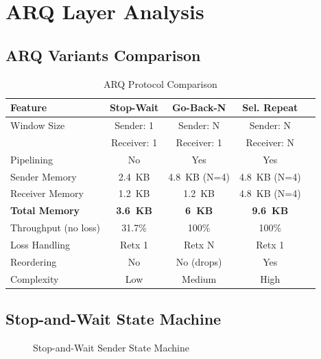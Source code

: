 \documentclass[12pt,letterpaper]{article}
\begin{document}
\section{ARQ Layer Analysis}

\subsection{ARQ Variants Comparison}

\begin{table}[H]
\centering
\caption{ARQ Protocol Comparison}
\begin{tabular}{lcccc}
\toprule
\textbf{Feature} & \textbf{Stop-Wait} & \textbf{Go-Back-N} & \textbf{Sel. Repeat} \\
\midrule
Window Size & Sender: 1 & Sender: N & Sender: N \\
& Receiver: 1 & Receiver: 1 & Receiver: N \\
Pipelining & No & Yes & Yes \\
Sender Memory & 2.4~KB & 4.8~KB (N=4) & 4.8~KB (N=4) \\
Receiver Memory & 1.2~KB & 1.2~KB & 4.8~KB (N=4) \\
\textbf{Total Memory} & \textbf{3.6~KB} & \textbf{6~KB} & \textbf{9.6~KB} \\
Throughput (no loss) & 31.7\% & 100\% & 100\% \\
Loss Handling & Retx 1 & Retx N & Retx 1 \\
Reordering & No & No (drops) & Yes \\
Complexity & Low & Medium & High \\
\bottomrule
\end{tabular}
\end{table}

\subsection{Stop-and-Wait State Machine}

\begin{figure}[H]
\centering
{}
\caption{Stop-and-Wait Sender State Machine}
\end{figure}
\end{document}
